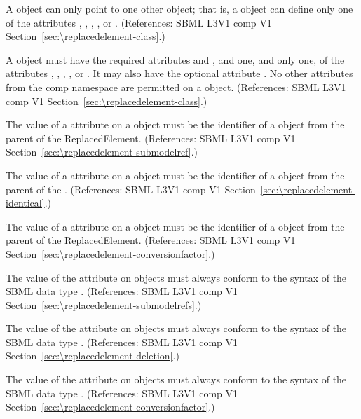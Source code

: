 \begin{sbmlenum}
 { A \ReplacedElement object can only point to one other object; that is,
  a \ReplacedElement object can define only one of the attributes  , 
  , , , or .
  (References: SBML L3V1 comp V1 Section~\ref{sec:\replacedelement-class}.) }


 { A \ReplacedElement object must have the
  required attributes  and , and one, 
  and only one, of the attributes , 
  , , , or .
  It may also have the optional attribute .
  No other attributes from the comp namespace are permitted on a
  \ReplacedElement object.
  (References: SBML L3V1 comp V1 Section~\ref{sec:\replacedelement-class}.) }


 { The value of a  attribute on a
  \ReplacedElement object must be the identifier of a \Submodel object
  from the parent \Model of the ReplacedElement.  
  (References: SBML L3V1 comp V1 Section~\ref{sec:\replacedelement-submodelref}.) }


 { The value of a  attribute on a
  \ReplacedElement object must be the identifier of a \Deletion object
  from the parent \Model of the \ReplacedElement.  
  (References: SBML L3V1 comp V1 Section~\ref{sec:\replacedelement-identical}.) }


 { The value of a  attribute on a
  \ReplacedElement object must be the identifier of a \Parameter object
  from the parent \Model of the ReplacedElement.  
  (References: SBML L3V1 comp V1 Section~\ref{sec:\replacedelement-conversionfactor}.) }


 { The value of the  attribute on
  \ReplacedElement objects must always conform to the syntax of
  the SBML data type .
  (References: SBML L3V1 comp V1 Section~\ref{sec:\replacedelement-submodelrefs}.) }
  

 { The value of the  attribute on
  \ReplacedElement objects must always conform to the syntax of
  the SBML data type .
  (References: SBML L3V1 comp V1 Section~\ref{sec:\replacedelement-deletion}.) }
  

 { The value of the  attribute on
  \ReplacedElement objects must always conform to the syntax of
  the SBML data type .
  (References: SBML L3V1 comp V1 Section~\ref{sec:\replacedelement-conversionfactor}.) }
  


\end{sbmlenum}
